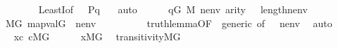 \begin{isabellebody}
\ \ \ \ \ \ \isamarkupfalse%
\ LeastI{\isacharbrackleft}{\kern0pt}of\ {\isachardoublequoteopen}{\isasymlambda}\ {\isasymalpha}{\isachardot}{\kern0pt}\ {\isacharquery}{\kern0pt}P{\isacharparenleft}{\kern0pt}{\isasymlangle}{\isasymrho}{\isacharcomma}{\kern0pt}q{\isasymrangle}{\isacharcomma}{\kern0pt}{\isasymalpha}{\isacharparenright}{\kern0pt}{\isachardoublequoteclose}\ {\isacharquery}{\kern0pt}{\isasymalpha}{\isacharbrackright}{\kern0pt}\ \isamarkupfalse%
\ auto\isanewline
\ \ \ \ \isamarkupfalse%
\ {\isacartoucheopen}q{\isasymin}G{\isacartoucheclose}\ {\isacartoucheopen}{\isasymrho}{\isasymin}M{\isacartoucheclose}\ {\isacartoucheopen}nenv{\isasymin}{\isacharunderscore}{\kern0pt}{\isacartoucheclose}\ {\isacartoucheopen}arity{\isacharparenleft}{\kern0pt}{\isasymphi}{\isacharparenright}{\kern0pt}{\isasymle}\ {}\ {\isacharhash}{\kern0pt}{\isacharplus}{\kern0pt}\ length{\isacharparenleft}{\kern0pt}nenv{\isacharparenright}{\kern0pt}{\isacartoucheclose}\isanewline
\ \ \ \ \isamarkupfalse%
\ {\isachardoublequoteopen}M{\isacharbrackleft}{\kern0pt}G{\isacharbrackright}{\kern0pt}{\isacharcomma}{\kern0pt}\ map{\isacharparenleft}{\kern0pt}val{\isacharparenleft}{\kern0pt}G{\isacharparenright}{\kern0pt}{\isacharcomma}{\kern0pt}{\isacharbrackleft}{\kern0pt}{\isasymrho}{\isacharcomma}{\kern0pt}{\isasymtau}{\isacharbrackright}{\kern0pt}\ {\isacharat}{\kern0pt}\ nenv{\isacharparenright}{\kern0pt}\ {\isasymTurnstile}\ {\isasymphi}{\isachardoublequoteclose}\isanewline
\ \ \ \ \ \ \isamarkupfalse%
\ truth{\isacharunderscore}{\kern0pt}lemma{\isacharbrackleft}{\kern0pt}OF\ {\isacartoucheopen}{\isasymphi}{\isasymin}{\isacharunderscore}{\kern0pt}{\isacartoucheclose}\ generic{\isacharcomma}{\kern0pt}\ of\ {\isachardoublequoteopen}{\isacharbrackleft}{\kern0pt}{\isasymrho}{\isacharcomma}{\kern0pt}{\isasymtau}{\isacharbrackright}{\kern0pt}\ {\isacharat}{\kern0pt}\ nenv{\isachardoublequoteclose}{\isacharbrackright}{\kern0pt}\ \isamarkupfalse%
\ auto\isanewline
\ \ \ \ \isamarkupfalse%
\ \isamarkupfalse%
\ {\isacartoucheopen}x{\isasymin}c{\isacartoucheclose}\ {\isacartoucheopen}c{\isasymin}M{\isacharbrackleft}{\kern0pt}G{\isacharbrackright}{\kern0pt}{\isacartoucheclose}\isanewline
\ \ \ \ \isamarkupfalse%
\ {\isachardoublequoteopen}x{\isasymin}M{\isacharbrackleft}{\kern0pt}G{\isacharbrackright}{\kern0pt}{\isachardoublequoteclose}\ \isamarkupfalse%
\ transitivity{\isacharunderscore}{\kern0pt}MG\ \isamarkupfalse%

\end{isabellebody}
